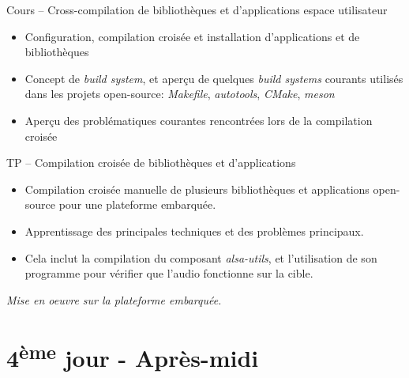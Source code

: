 \documentclass[a4paper,12pt,obeyspaces,spaces,hyphens]{article}
\begin{document}
\feagendatwocolumn
{Cours – Cross-compilation de bibliothèques et d'applications espace utilisateur}
{
  \begin{itemize}
  \item Configuration, compilation croisée et installation
    d'applications et de bibliothèques
  \item Concept de {\em build system}, et aperçu de quelques {\em
      build systems} courants utilisés dans les projets open-source:
    {\em Makefile}, {\em autotools}, {\em CMake}, {\em meson}
  \item Aperçu des problématiques courantes rencontrées lors de la
    compilation croisée
  \end{itemize}
}
{TP – Compilation croisée de bibliothèques et d'applications}
{
  \begin{itemize}
  \item Compilation croisée manuelle de plusieurs bibliothèques et
    applications open-source pour une plateforme embarquée.
  \item Apprentissage des principales techniques et des problèmes
    principaux.
  \item Cela inclut la compilation du composant {\em alsa-utils},
     et l'utilisation de son programme  pour
     vérifier que l'audio fonctionne sur la cible.
  \end{itemize}

  \vspace{0.5cm}
  {\em Mise en oeuvre sur la plateforme embarquée.}
}

\section{4\textsuperscript{ème} jour - Après-midi}
\end{document}
